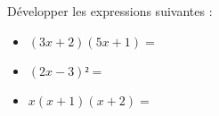 \documentclass{automatisme}
\begin{document}
\begin{frame}
	Développer les expressions suivantes :
	\begin{itemize}
		\item $(3x + 2)(5x + 1) = $
		\item $(2x - 3)² = $
		\item $x(x + 1)(x + 2) = $
	\end{itemize}
\end{frame}
\end{document}
